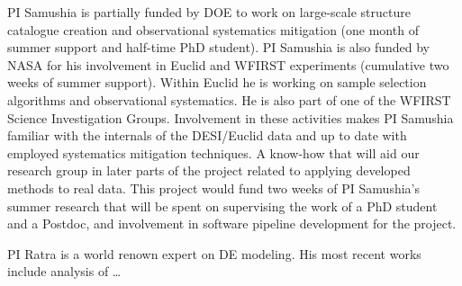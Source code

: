 PI Samushia is partially funded by DOE to work on large-scale structure
catalogue creation and observational systematics mitigation (one month of
summer support and half-time PhD student). PI Samushia is also funded by NASA
for his involvement in Euclid and WFIRST experiments (cumulative two weeks of
summer support). Within Euclid he is working on sample selection algorithms
and observational systematics. He is also part of one of the WFIRST Science
Investigation Groups. Involvement in these activities makes PI Samushia
familiar with  the internals of the DESI/Euclid data and up to date with
employed systematics mitigation techniques. A know-how that will aid our
research group in later parts of the project related to applying  developed
methods to real data. This project would fund two weeks of PI Samushia's
summer research that will be spent on supervising the work of a PhD student
and a Postdoc, and involvement in software pipeline development for the
project.

PI Ratra is a world renown expert on DE modeling. His most recent works include
analysis of \ldots




